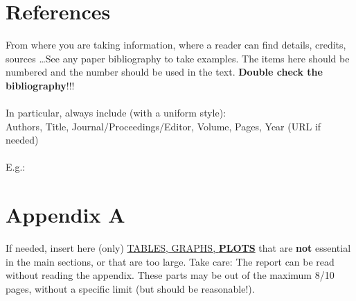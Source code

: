 \documentclass[11pt, letterpaper]{article}  %
\begin{document}
\section*{References}
From where you are taking information, where a reader can find details, credits, sources \dots See any paper bibliography to take examples. The items here should be numbered and the number should be used in the text. \textbf{Double check the bibliography}!!! \\ \\
In particular, always include (with a uniform style): \\

Authors, Title, Journal/Proceedings/Editor, Volume, Pages, Year (URL if needed) \\ \\
E.g.: 

\vspace{-1cm}

\newpage

\section*{Appendix A}
If needed, insert here (only) \underline{TABLES, GRAPHS, \textbf{PLOTS}} that are \textbf{not} essential in the main sections, or that are too large. 
Take care: The report can be read without reading the appendix. 
These parts may be out of the maximum 8/10 pages, without a specific limit (but should be reasonable!). \\ \\ 
\end{document}
